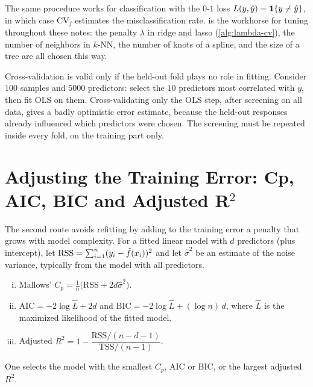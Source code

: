 The same procedure works for classification with the $0$-$1$ loss $L(y,\hat y)=\mathbf{1}\{y\ne\hat y\}$, in which case $\mathrm{CV}_j$ estimates the misclassification rate.  is the workhorse for tuning throughout these notes: the penalty $\lambda$ in ridge and lasso (\cref{alg:lambda-cv}), the number of neighbors in $k$-NN, the number of knots of a spline, and the size of a tree are all chosen this way.

\begin{remark}\label{rem:cv-pitfall}
Cross-validation is valid only if the held-out fold plays no role in fitting. Consider $100$ samples and $5000$ predictors: select the $10$ predictors most correlated with $y$, then fit OLS on them. Cross-validating only the OLS step, after screening on all data, gives a badly optimistic error estimate, because the held-out responses already influenced which predictors were chosen. The screening must be repeated inside every fold, on the training part only.
\end{remark}

\section{Adjusting the Training Error: Cp, AIC, BIC and Adjusted R\texorpdfstring{$^2$}{2}}\label{sec:info-criteria}

The second route avoids refitting by adding to the training error a penalty that grows with model complexity. For a fitted linear model with $d$ predictors (plus intercept), let $\mathrm{RSS}=\sum_{i=1}^n(y_i-\hat f(x_i))^2$ and let $\hat\sigma^2$ be an estimate of the noise variance, typically from the model with all predictors.

\begin{definition}\label{def:criteria}
\leavevmode
\begin{enumerate}[(i)]
  \item Mallows' $C_p=\frac1n\big(\mathrm{RSS}+2d\hat\sigma^2\big)$.
  \item $\mathrm{AIC}=-2\log\hat L+2d$ and $\mathrm{BIC}=-2\log\hat L+(\log n)\,d$, where $\hat L$ is the maximized likelihood of the fitted model.
  \item Adjusted $R^2=1-\dfrac{\mathrm{RSS}/(n-d-1)}{\mathrm{TSS}/(n-1)}$.
\end{enumerate}
One selects the model with the smallest $C_p$, AIC or BIC, or the largest adjusted $R^2$.
\end{definition}

